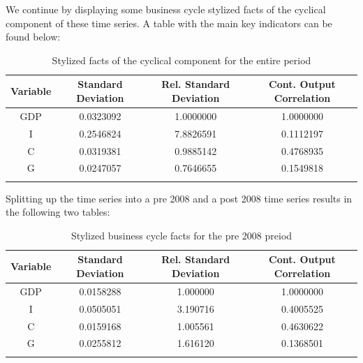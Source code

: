 \documentclass[a4paper,11pt]{article}
\begin{document}
\pagebreak 
We continue by displaying some business cycle stylized facts of the cyclical component of these time series. A table with the main key indicators can be found below:\\
\begin{longtable}[c]{cccc}
\toprule
Variable & Standard Deviation & Rel. Standard Deviation & Cont. Output Correlation\\* \midrule
\endfirsthead
\endhead
\bottomrule
\endfoot
\endlastfoot
GDP & 0.0323092 & 1.0000000 & 1.0000000 \\
I & 0.2546824 & 7.8826591 & 0.1112197\\
C & 0.0319381 & 0.9885142 & 0.4768935\\
G & 0.0247057 & 0.7646655 & 0.1549818\\* \bottomrule
\caption{Stylized facts of the cyclical component for the entire period}
\end{longtable}

Splitting up the time series into a pre 2008 and a post 2008 time series results in the following two tables:
\begin{longtable}[c]{cccc}
\toprule
Variable & Standard Deviation & Rel. Standard Deviation & Cont. Output Correlation\\* \midrule
\endfirsthead
\endhead
\bottomrule
\endfoot
\endlastfoot
GDP & 0.0158288 & 1.000000 & 1.0000000\\
I & 0.0505051 & 3.190716 & 0.4005525\\
C & 0.0159168 & 1.005561 & 0.4630622\\
G & 0.0255812 & 1.616120 & 0.1368501\\* \bottomrule
\caption{Stylized business cycle facts for the pre 2008 preiod}
\end{longtable}
\end{document}
